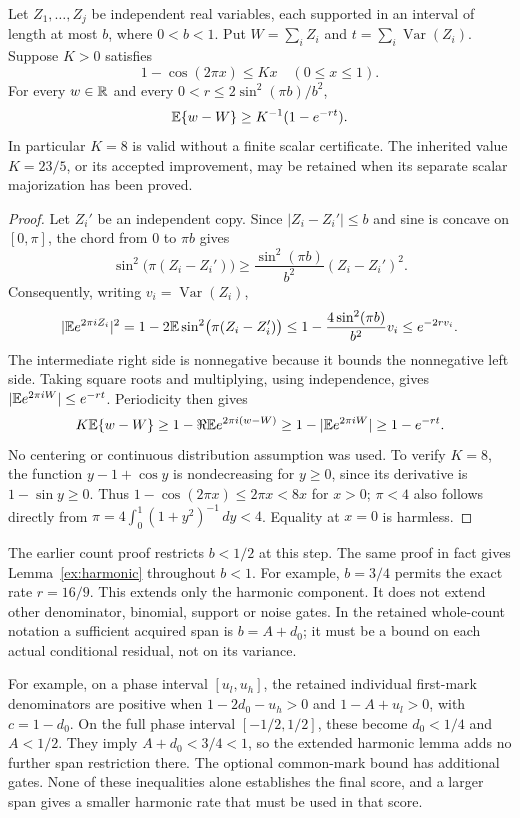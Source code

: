 \begin{lemma}\label{ex:harmonic}
Let $Z_1,\ldots,Z_j$ be independent real variables, each supported in an
interval of length at most $b$, where $0<b<1$.
Put $W=\sum_i Z_i$ and $t=\sum_i\operatorname{Var}(Z_i)$.
Suppose $K>0$ satisfies
\[
                  1-\cos(2\pi x)\le Kx\quad(0\le x\le1).
\]
For every $w\in\mathbb R$ and every
$0<r\le2\sin^2(\pi b)/b^2$,
\begin{equation}\label{ex:gain}
                     \mathbb E\{w-W\}\ge K^{-1}(1-e^{-rt}).
\end{equation}
In particular $K=8$ is valid without a finite scalar certificate.
The inherited value $K=23/5$, or its accepted improvement, may be retained
when its separate scalar majorization has been proved.
\end{lemma}
\begin{proof}
Let $Z_i'$ be an independent copy. Since $|Z_i-Z_i'|\le b$ and sine is
concave on $[0,\pi]$, the chord from $0$ to $\pi b$ gives
\[
 \sin^2\bigl(\pi(Z_i-Z_i')\bigr)
 \ge\frac{\sin^2(\pi b)}{b^2}(Z_i-Z_i')^2.
\]
Consequently, writing $v_i=\operatorname{Var}(Z_i)$,
\[
 |\mathbb E e^{2\pi iZ_i}|^2
 =1-2\mathbb E\sin^2\bigl(\pi(Z_i-Z_i')\bigr)
 \le1-\frac{4\sin^2(\pi b)}{b^2}v_i
 \le e^{-2rv_i}.
\]
The intermediate right side is nonnegative because it bounds the
nonnegative left side. Taking square roots and multiplying, using
independence, gives $|\mathbb E e^{2\pi iW}|\le e^{-rt}$. Periodicity then gives
\[
 K\mathbb E\{w-W\}\ge1-\Re\mathbb E e^{2\pi i(w-W)}
                \ge1-|\mathbb E e^{2\pi iW}|\ge1-e^{-rt}.
\]
No centering or continuous distribution assumption was used. To verify
$K=8$, the function $y-1+\cos y$ is nondecreasing for $y\ge0$, since its
derivative is $1-\sin y\ge0$. Thus $1-\cos(2\pi x)\le2\pi x<8x$ for
$x>0$; $\pi<4$ also follows directly from
$\pi=4\int_0^1(1+y^2)^{-1}\,dy<4$. Equality at $x=0$ is harmless.
\end{proof}

The earlier count proof restricts $b<1/2$ at this step. The same proof in
fact gives Lemma~\ref{ex:harmonic} throughout $b<1$. For example,
$b=3/4$ permits the exact rate $r=16/9$.
This extends only the harmonic component. It does not extend other
denominator, binomial, support or noise gates. In the retained whole-count
notation a sufficient acquired span is $b=A+d_0$; it must be a bound on
each actual conditional residual, not on its variance.

For example, on a phase interval $[u_l,u_h]$, the retained individual
first-mark denominators are positive when
$1-2d_0-u_h>0$ and $1-A+u_l>0$, with $c=1-d_0$.
On the full phase interval $[-1/2,1/2]$, these become $d_0<1/4$
and $A<1/2$. They imply $A+d_0<3/4<1$, so the extended harmonic
lemma adds no further span restriction there. The optional common-mark
bound has additional gates. None of these inequalities alone establishes
the final score, and a larger span gives a smaller harmonic rate that must
be used in that score.

